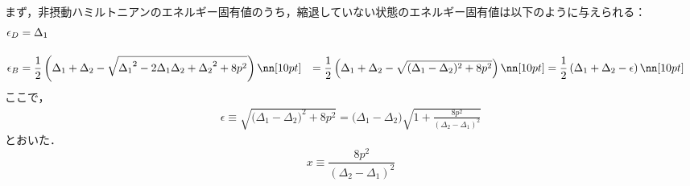 まず，非摂動ハミルトニアンのエネルギー固有値のうち，縮退していない状態のエネルギー固有値は以下のように与えられる：
\begin{align}
    \epsilon_D&=
    {\Delta_{1}}\\[10pt]
    \epsilon_B&=
    \frac{1}{2}\left({\Delta_{1}}+{\Delta_{2}}-\sqrt{{\Delta_{1}}^2-2{\Delta_{1}}{\Delta_{2}}+{\Delta_{2}}^2+8p^2}\right)\nn[10pt]
    &=\frac{1}{2}\left({\Delta_{1}}+{\Delta_{2}}-\sqrt{{
    (\Delta_{1}}-\Delta_{2})^2+8p^2}\right)\nn[10pt]
    &=\frac{1}{2}\left({\Delta_{1}}+{\Delta_{2}}-\epsilon\right)\nn[10pt]
\end{align}
ここで，
\begin{align}
    \epsilon\equiv
    \sqrt{{
    (\Delta_{1}}-\Delta_{2})^2+8p^2}
    ={(\Delta_{1}}-\Delta_{2})
    \sqrt{1+\frac{8p^2}{(\Delta_{2}-\Delta_{1})^2}}
\end{align}
とおいた．
\begin{equation}
    x\equiv\frac{8p^2}{(\Delta_{2}-\Delta_{1})^2}
\end{equation}
